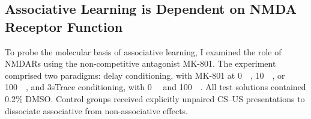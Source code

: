 

\subsection{Associative Learning is Dependent on NMDA Receptor Function}

To probe the molecular basis of associative learning, I examined the role of NMDARs using the non-competitive antagonist MK-801. The experiment comprised two paradigms: delay conditioning, with MK-801 at 0~\si{\micro\Molar}, 10~\si{\micro\Molar}, or 100~\si{\micro\Molar}, and 3sTrace conditioning, with 0~\si{\micro\Molar} and 100~\si{\micro\Molar}. All test solutions contained 0.2\% DMSO. Control groups received explicitly unpaired CS--US presentations to dissociate associative from non-associative effects.

